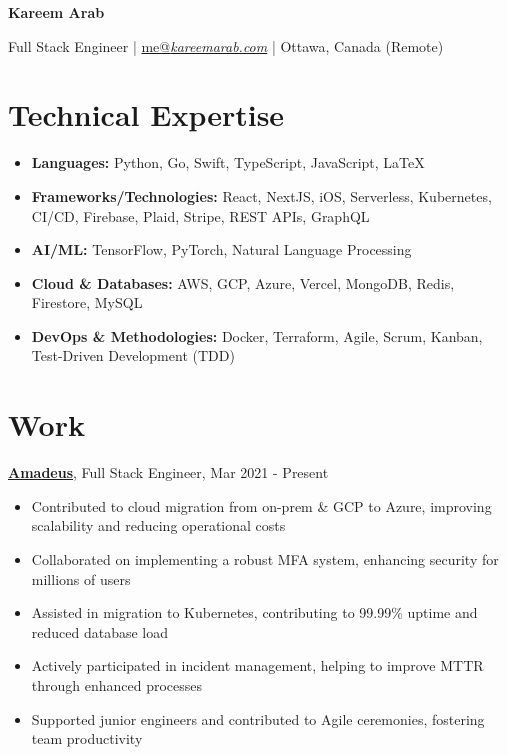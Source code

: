\documentclass[9pt]{article}
\begin{document}
\begin{center}
    {\LARGE \textbf{Kareem Arab}}\par\smallskip
    Full Stack Engineer | \href{mailto:me@kareemarab.com}{me@\textit{kareemarab.com}} | Ottawa, Canada (Remote)
\end{center}

\section*{Technical Expertise}
\begin{itemize}
    \setlength\itemsep{0em}
    \item \textbf{Languages:} Python, Go, Swift, TypeScript, JavaScript, \LaTeX
    \item \textbf{Frameworks/Technologies:} React, NextJS, iOS, Serverless, Kubernetes, CI/CD, Firebase, Plaid, Stripe, REST APIs, GraphQL
    \item \textbf{AI/ML:} TensorFlow, PyTorch, Natural Language Processing
    \item \textbf{Cloud \& Databases:} AWS, GCP, Azure, Vercel, MongoDB, Redis, Firestore, MySQL
    \item \textbf{DevOps \& Methodologies:} Docker, Terraform, Agile, Scrum, Kanban, Test-Driven Development (TDD)
\end{itemize}

\section*{Work}

\noindent
\textbf{\href{https://amadeus.com/en}{Amadeus}}, Full Stack Engineer, Mar 2021 - Present
\begin{itemize}
    \setlength\itemsep{0em}
    \item Contributed to cloud migration from on-prem \& GCP to Azure, improving scalability and reducing operational costs
    \item Collaborated on implementing a robust MFA system, enhancing security for millions of users
    \item Assisted in migration to Kubernetes, contributing to 99.99\% uptime and reduced database load
    \item Actively participated in incident management, helping to improve MTTR through enhanced processes
    \item Supported junior engineers and contributed to Agile ceremonies, fostering team productivity
\end{itemize}
\end{document}
